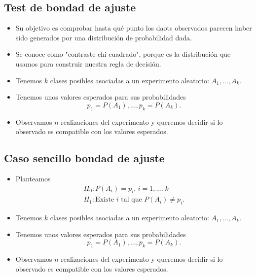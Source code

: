 \subsection{Test de bondad de ajuste}
\begin{tcolorbox}[colback=blue!5!white, colframe=blue!75!black, title=\textbf{Es un contraste no paramétrico}]
\begin{itemize}[label=\textbullet]
    \item Su objetivo es comprobar hasta qué punto los daots observados parecen haber sido generados por una distribución de probabilidad dada.
    \item Se conoce como "contraste chi-cuadrado", porque es la distribución que usamos para construir nuestra regla de decisión.
\end{itemize}
\end{tcolorbox}
\begin{tcolorbox}[colback=blue!5!white, colframe=blue!75!black, title=\textbf{Primer ejemplo, el caso más sencillo:}]
\begin{itemize}[label=\textbullet]
    \item Tenemos $k$ clases posibles asociadas a un experimento aleatorio: $A_1,\dots,A_k$.
    \item Tenemos unos valores esperados para sus probabilidades \[
    p_1=P(A_1),\dots,p_k=P(A_k).
    \] 
\item Observamos $n$ realizaciones del experimento y queremos decidir si lo observado es compatible con los valores esperados.
\end{itemize}
\end{tcolorbox}
\subsection*{Caso sencillo bondad de ajuste}
\begin{tcolorbox}[colback=blue!5!white, colframe=blue!75!black, title=\textbf{El caso más sencillo:}]
\begin{itemize}[label=\textbullet]
    \item Planteamos \[
    \begin{array}{l}
        H_0:P(A_i)=p_i,\,i=1,\dots,k\\
        H_1:\text{Existe $i$ tal que  $P(A_i)\neq p_i$.}
    \end{array}
    \] 
\item Tenemos $k$ clases posibles asociadas a un experimento aleatorio: $A_1,\dots,A_k$.
\item Tenemos unos valores esperados para sus probabilidades \[
p_1=P(A_1),\dots,p_k=P(A_k).
\] 
\item Observamos $n$ realizaciones del experimento y queremos decidir si lo observado es compatible con los valores esperados.
\end{itemize}
\end{tcolorbox}

